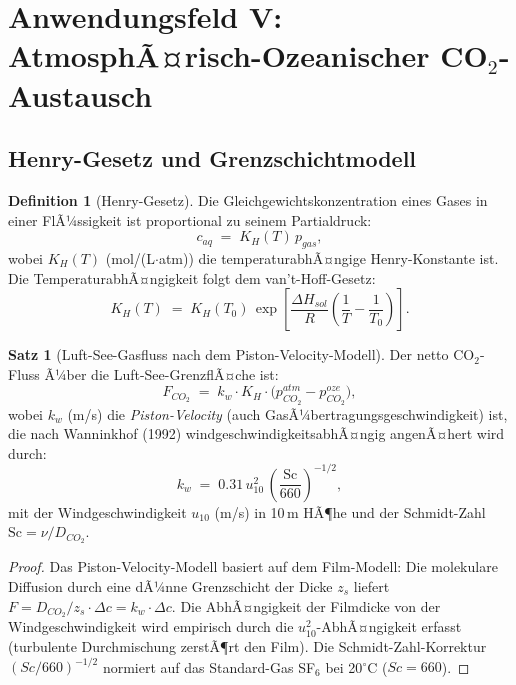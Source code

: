 ﻿\documentclass[a4paper,12pt]{article}
\theoremstyle{definition}
\newtheorem{definition}{Definition}
\newtheorem{satz}{Satz}
\begin{document}
\section{Anwendungsfeld V: AtmosphÃ¤risch-Ozeanischer CO$_2$-Austausch}

\subsection{Henry-Gesetz und Grenzschichtmodell}

\begin{definition}[Henry-Gesetz]
    Die Gleichgewichtskonzentration eines Gases in einer FlÃ¼ssigkeit ist
    proportional zu seinem Partialdruck:
    \[
        c_{aq} \;=\; K_H(T)\,p_{gas},
    \]
    wobei $K_H(T)$ (mol/(L$\cdot$atm)) die temperaturabhÃ¤ngige Henry-Konstante ist.
    Die TemperaturabhÃ¤ngigkeit folgt dem van't-Hoff-Gesetz:
    \[
        K_H(T) \;=\; K_H(T_0)\,\exp\!\left[\frac{\Delta H_{sol}}{R}
        \left(\frac{1}{T} - \frac{1}{T_0}\right)\right].
    \]
\end{definition}

\begin{satz}[Luft-See-Gasfluss nach dem Piston-Velocity-Modell]
    Der netto CO$_2$-Fluss Ã¼ber die Luft-See-GrenzflÃ¤che ist:
    \[
        F_{CO_2} \;=\; k_w \cdot K_H \cdot \bigl(p_{CO_2}^{atm} - p_{CO_2}^{oze}\bigr),
    \]
    wobei $k_w$ (m/s) die \emph{Piston-Velocity} (auch GasÃ¼bertragungsgeschwindigkeit)
    ist, die nach Wanninkhof (1992) windgeschwindigkeitsabhÃ¤ngig angenÃ¤hert wird durch:
    \[
        k_w \;=\; 0.31\,u_{10}^2\,\left(\frac{\mathrm{Sc}}{660}\right)^{-1/2},
    \]
    mit der Windgeschwindigkeit $u_{10}$ (m/s) in 10\,m HÃ¶he und der Schmidt-Zahl
    $\mathrm{Sc} = \nu/D_{CO_2}$.
\end{satz}

\begin{proof}
    Das Piston-Velocity-Modell basiert auf dem Film-Modell:
    Die molekulare Diffusion durch eine dÃ¼nne Grenzschicht der Dicke $z_s$
    liefert $F = D_{CO_2}/z_s \cdot \Delta c = k_w \cdot \Delta c$.
    Die AbhÃ¤ngigkeit der Filmdicke von der Windgeschwindigkeit wird empirisch
    durch die $u_{10}^2$-AbhÃ¤ngigkeit erfasst (turbulente Durchmischung
    zerstÃ¶rt den Film). Die Schmidt-Zahl-Korrektur $(Sc/660)^{-1/2}$ normiert
    auf das Standard-Gas SF$_6$ bei 20$^\circ$C ($Sc = 660$). \qedhere
\end{proof}
\end{document}
